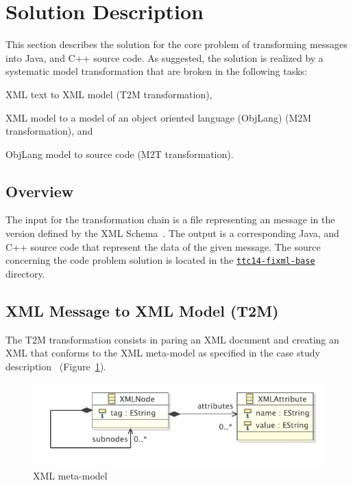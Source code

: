 
\section{Solution Description}
\label{sec:SolutionDescription}

This section describes the solution for the core problem of transforming \FIXML messages into Java, \Csharp and C++ source code.
As suggested, the solution is realized by a systematic model transformation that are broken in the following tasks:
\begin{inparaenum}[(1)]
  \item XML text to XML model (T2M transformation),
  \item XML model to a model of an object oriented language (ObjLang) (M2M transformation), and
  \item ObjLang model to source code (M2T transformation).
\end{inparaenum}

\subsection{Overview}

The input for the transformation chain is a file representing an \FIXML message in the  version defined by the \FIXML XML Schema~\cite{FIXML2004}.
The output is a corresponding Java, \Csharp and C++ source code that represent the data of the given \FIXML message. 
The source concerning the code problem solution is located in the \href{https://github.com/fikovnik/ttc14-fixml-sigma/tree/master/ttc14-fixml-base}{\texttt{ttc14-fixml-base}} directory.

\subsection{\FIXML XML Message to XML Model (T2M)}

The T2M transformation consists in paring an \FIXML XML document and creating an XML that conforms to the XML meta-model as specified in the case study description~\cite{Lano2014} (\Cf Figure~\ref{fig:XMLMetaModel}).

\begin{figure}[h!bt]
  \centering
  \includegraphics[width=.6\textwidth]{figures/XMLMetaModel.pdf}
  \caption{XML meta-model}
  \label{fig:XMLMetaModel}
\end{figure}

